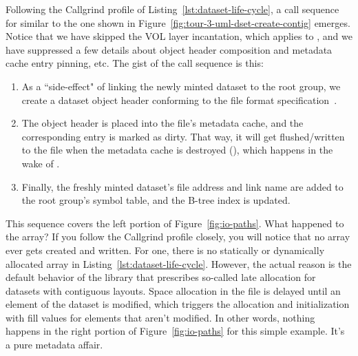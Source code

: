Following the Callgrind profile of Listing~\ref{lst:dataset-life-cycle}, a call sequence for  similar to the one shown in Figure~\ref{fig:tour-3-uml-dset-create-contig} emerges. Notice that we have skipped the VOL layer incantation, which applies to , and we have suppressed a few details about object header composition and metadata cache entry pinning, etc. The gist of the call sequence is this:

\begin{enumerate}
    \item As a ``side-effect" of linking the newly minted dataset to the root group, we create a dataset object header conforming to the file format specification~\cite{ffmt}.
    \item The object header is placed into the file's metadata cache, and the corresponding entry is marked as dirty. That way, it will get flushed/written to the file when the metadata cache is destroyed (), which happens in the wake of .
    \item Finally, the freshly minted dataset's file address and link name are added to the root group's symbol table, and the B-tree index is updated.
\end{enumerate}

This sequence covers the left portion of Figure~\ref{fig:io-paths}. What happened to the array? If you follow the Callgrind profile closely, you will notice that no array ever gets created and written. For one, there is no statically or dynamically allocated array in Listing~\ref{lst:dataset-life-cycle}. However, the actual reason is the default behavior of the library that prescribes so-called late allocation for datasets with contiguous layouts. Space allocation in the file is delayed until an element of the dataset is modified, which triggers the allocation and initialization with fill values for elements that aren't modified. In other words, nothing happens in the right portion of Figure~\ref{fig:io-paths} for this simple example. It's a pure metadata affair.


